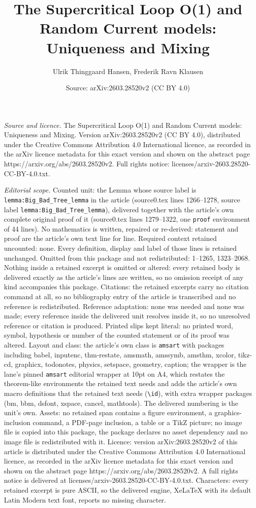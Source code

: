 \documentclass[10pt,a4paper]{amsart}
\title[The Supercritical Loop O(1) and Random Current models: Uniqu]{The Supercritical Loop O(1) and Random Current models: Uniqueness and Mixing}
\author{Ulrik Thinggaard Hansen, Frederik Ravn Klausen}
\date{Source: arXiv:2603.28520v2 (CC BY 4.0)}
\begin{document}
\maketitle

\noindent\emph{Source and licence.} The Supercritical Loop O(1) and Random Current models: Uniqueness and Mixing. Version arXiv:2603.28520v2 (CC BY 4.0), distributed under the Creative Commons Attribution 4.0 International licence, as recorded in the arXiv licence metadata for this exact version and shown on the abstract page https://arxiv.org/abs/2603.28520v2. Full rights notice: licenses/arxiv-2603.28520-CC-BY-4.0.txt.\par\smallskip

\noindent\textit{Editorial scope.} Counted unit: the Lemma whose source label is \texttt{lemma:Big\_Bad\_Tree\_lemma} in the article (source0.tex lines 1266--1278, source label \texttt{lemma:Big\_Bad\_Tree\_lemma}), delivered together with the article's own complete original proof of it (source0.tex lines 1279--1322, one \texttt{proof} environment of 44 lines). No mathematics is written, repaired or re-derived: statement and proof are the article's own text line for line. Required context retained uncounted: none. Every definition, display and label of those lines is retained unchanged. Omitted from this package and not redistributed: 1--1265, 1323--2068. Nothing inside a retained excerpt is omitted or altered: every retained body is delivered exactly as the article's lines are written, so no omission receipt of any kind accompanies this package. Citations: the retained excerpts carry no citation command at all, so no bibliography entry of the article is transcribed and no reference is redistributed. Reference adaptation: none was needed and none was made; every reference inside the delivered unit resolves inside it, so no unresolved reference or citation is produced. Printed slips kept literal: no printed word, symbol, hypothesis or number of the counted statement or of its proof was altered. Layout and class: the article's own class is \texttt{amsart} with packages including babel, inputenc, thm-restate, amsmath, amssymb, amsthm, xcolor, tikz-cd, graphicx, todonotes, physics, setspace, geometry, caption; the wrapper is the lane's pinned \texttt{amsart} editorial wrapper at 10pt on A4, which restates the theorem-like environments the retained text needs and adds the article's own macro definitions that the retained text needs (\texttt{\textbackslash id}), with extra wrapper packages (bm, bbm, dsfont, xspace, cancel, mathtools). The delivered numbering is the unit's own. Assets: no retained span contains a figure environment, a graphics-inclusion command, a PDF-page inclusion, a table or a TikZ picture; no image file is copied into this package, the package declares no asset dependency and no image file is redistributed with it. Licence: version arXiv:2603.28520v2 of this article is distributed under the Creative Commons Attribution 4.0 International licence, as recorded in the arXiv licence metadata for this exact version and shown on the abstract page https://arxiv.org/abs/2603.28520v2. A full rights notice is delivered at licenses/arxiv-2603.28520-CC-BY-4.0.txt. Characters: every retained excerpt is pure ASCII, so the delivered engine, XeLaTeX with its default Latin Modern text font, reports no missing character.
\end{document}
